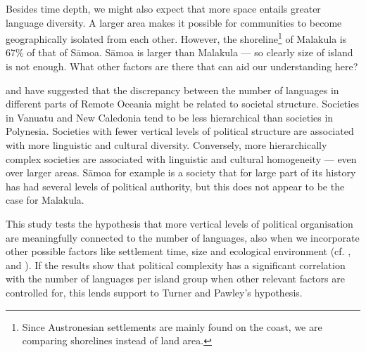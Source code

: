 \documentclass[unnumsec,webpdf,modern,medium]{oup-authoring-template}
\begin{document}
Besides time depth, we might also expect that more space entails greater language diversity. A larger area makes it possible for communities to become geographically isolated from each other. However, the shoreline\footnote{Since Austronesian settlements are mainly found on the coast, we are comparing shorelines instead of land area.} of Malakula is 67\% of that of S\={a}moa. S\={a}moa is larger than Malakula --- so clearly size of island is not enough. What other factors are there that can aid our understanding here?

\citet{turner1884} and \citet{pawley81,pawley2007} have suggested that the discrepancy between the number of languages in different parts of Remote Oceania might be related to societal structure. Societies in Vanuatu and New Caledonia tend to be less hierarchical than societies in Polynesia. Societies with fewer vertical levels of political structure are associated with more linguistic and cultural diversity. Conversely, more hierarchically complex societies are associated with linguistic and cultural homogeneity --- even over larger areas. S\={a}moa for example is a society that for large part of its history has had several levels of political authority, but this does not appear to be the case for Malakula.


This study tests the hypothesis that more vertical levels of political organisation are meaningfully connected to the number of languages, also when we incorporate other possible factors like settlement time, size and ecological environment (cf. \citet{NETTLE1998}, \citet{gavin2012island} and \citet{hua2019ecological}). If the results show that political complexity has a significant correlation with the number of languages per island group when other relevant factors are controlled for, this lends support to Turner and Pawley's hypothesis.
 
\end{document}
